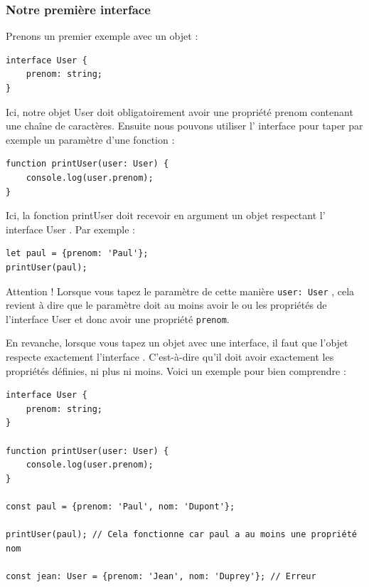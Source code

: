 \documentclass{article}
\begin{document}
\subsubsection{Notre première interface}
Prenons un premier exemple avec un objet :
\begin{verbatim}
interface User {
    prenom: string;
}
\end{verbatim}

Ici, notre objet {\color{monOrange}User} doit obligatoirement avoir une propriété {\color{blue}prenom} contenant une chaîne de caractères. Ensuite nous pouvons utiliser l' interface pour taper par exemple un paramètre d'une fonction :
\begin{verbatim}
function printUser(user: User) {
    console.log(user.prenom);
}
\end{verbatim}

Ici, la fonction {\color{blue}printUser} doit recevoir en argument un objet respectant l' interface {\color{monOrange}User} . Par exemple :
\begin{verbatim}
let paul = {prenom: 'Paul'};
printUser(paul);
\end{verbatim}

Attention ! Lorsque vous tapez le paramètre de cette manière {\tt user: User} , cela revient à dire que le paramètre doit au moins avoir le ou les propriétés de l'interface {\color{blue}User} et donc avoir une propriété {\tt prenom}.

En revanche, lorsque vous tapez un objet avec une interface, il faut que l'objet respecte exactement l'interface . C'est-à-dire qu'il doit avoir exactement les propriétés définies, ni plus ni moins. Voici un exemple pour bien comprendre :
\begin{verbatim}
interface User {
    prenom: string;
}

function printUser(user: User) {
    console.log(user.prenom);
}

const paul = {prenom: 'Paul', nom: 'Dupont'};

printUser(paul); // Cela fonctionne car paul a au moins une propriété nom

const jean: User = {prenom: 'Jean', nom: 'Duprey'}; // Erreur
\end{verbatim}
\end{document}
